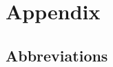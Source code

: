 \chapter{Appendix}

\section{Abbreviations}

\begin{table}
	\caption{Gloss Abbreviations}
	\label{table:gloss_abbreviations}
\end{table}